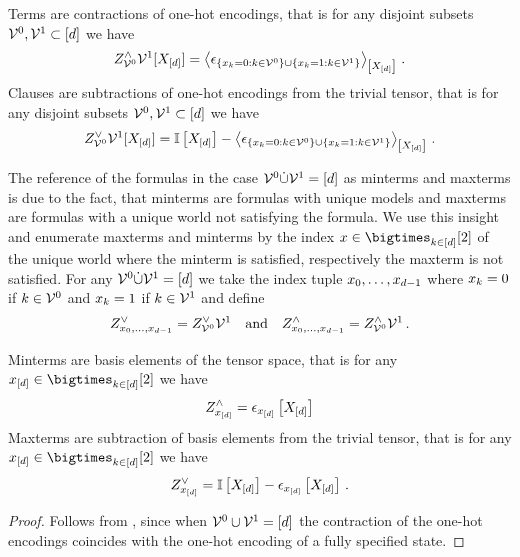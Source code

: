 \begin{lemma}
    \label{lem:termClauseOneHot}
    Terms are contractions of one-hot encodings, that is for any disjoint subsets $\mathcal{V}^{0},\mathcal{V}^{1}\subset[d]$ we have
    \[ Z^{\land}_{\mathcal{V}^{0}}{\mathcal{V}^{1}}[X_{[d]}] = \left\langle \epsilon_{\{x_{k}=0 : k\in\mathcal{V}^{0} \} \cup \{x_{k}=1 : k\in\mathcal{V}^{1}\}}\right\rangle_{\left[ X_{[d]} \right]} \, . \]
    Clauses are subtractions of one-hot encodings from the trivial tensor, that is for any disjoint subsets $\mathcal{V}^{0},\mathcal{V}^{1}\subset[d]$ we have
    \[ Z^{\lor}_{\mathcal{V}^{0}}{\mathcal{V}^{1}}[X_{[d]}] =
    \mathbb{I}\left[X_{[d]}\right] -
    \left\langle \epsilon_{\{x_{k}=0 : k\in\mathcal{V}^{0} \} \cup \{x_{k}=1 : k\in\mathcal{V}^{1}\}}\right\rangle_{\left[ X_{[d]} \right]} \, . \]
\end{lemma}


%
The reference of the formulas in the case $\mathcal{V}^{0}\dot{\cup}\mathcal{V}^{1} = [d]$ as minterms and maxterms is due to the fact, that minterms are formulas with unique models and maxterms are formulas with a unique world not satisfying the formula.
We use this insight and enumerate maxterms and minterms by the index $\catindex\in\atomstates$ of the unique world where the minterm is satisfied, respectively the maxterm is not satisfied.
For any $\mathcal{V}^{0}\dot{\cup}\mathcal{V}^{1} = [d]$ we take the index tuple $x_{0},\ldots,x_{d-1}$ where $x_{k}=0$ if $k\in\mathcal{V}^{0}$ and $x_{k}=1$ if $k\in\mathcal{V}^{1}$ and define
\begin{align*}
    Z^{\lor}_{x_{0},\ldots,x_{d-1}} = Z^{\lor}_{\mathcal{V}^{0}}{\mathcal{V}^{1}} \quad\text{and}\quad Z^{\land}_{x_{0},\ldots,x_{d-1}} = Z^{\land}_{\mathcal{V}^{0}}{\mathcal{V}^{1}} \, .
\end{align*}


\begin{corollary}
    Minterms are basis elements of the tensor space, that is for any $\shortcatindices\in\atomstates$ we have
    \begin{align*}
        Z^{\land}_{x_{[d]}} = \epsilon_{x_{[d]}}\left[X_{[d]}\right]
    \end{align*}
    Maxterms are subtraction of basis elements from the trivial tensor, that is for any $\shortcatindices\in\atomstates$ we have
    \begin{align*}
        Z^{\lor}_{x_{[d]}} = \mathbb{I}\left[X_{[d]}\right] - \epsilon_{x_{[d]}}\left[X_{[d]}\right]  \, .
    \end{align*}
\end{corollary}
\begin{proof}
    Follows from , since when $\mathcal{V}^{0}\cup\mathcal{V}^{1} = [d]$ the contraction of the one-hot encodings coincides with the one-hot encoding of a fully specified state.
\end{proof}


